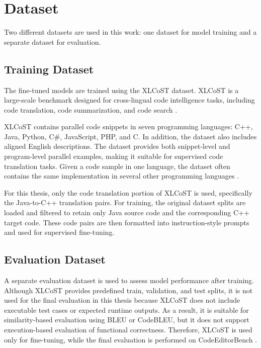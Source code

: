 \section{Dataset}

Two different datasets are used in this work: one dataset for model training
and a separate dataset for evaluation.

\subsection{Training Dataset}

The fine-tuned models are trained using the XLCoST dataset.
XLCoST is a large-scale benchmark designed for cross-lingual code intelligence tasks,
including code translation, code summarization, and code search
\cite{zhu2022xlcost}.

XLCoST contains parallel code snippets in seven programming languages:
C++, Java, Python, C\#, JavaScript, PHP, and C. In addition, the dataset also
includes aligned English descriptions. The dataset provides both snippet-level
and program-level parallel examples, making it suitable for supervised code
translation tasks. Given a code sample in one language, the dataset often
contains the same implementation in several other programming languages
\cite{zhu2022xlcost}.

For this thesis, only the code translation portion of XLCoST is used,
specifically the Java-to-C++ translation pairs. For training, the original
dataset splits are loaded and filtered to retain only Java source code and the
corresponding C++ target code. These code pairs are then formatted into
instruction-style prompts and used for supervised fine-tuning.

\subsection{Evaluation Dataset}

A separate evaluation dataset is used to assess model performance after
training. Although XLCoST provides predefined train, validation, and test
splits, it is not used for the final evaluation in this thesis because XLCoST
does not include executable test cases or expected runtime outputs. As a result,
it is suitable for similarity-based evaluation using BLEU or CodeBLEU, but it
does not support execution-based evaluation of functional correctness.
Therefore, XLCoST is used only for fine-tuning, while the final evaluation is
performed on CodeEditorBench \cite{codeeditorbench}.

